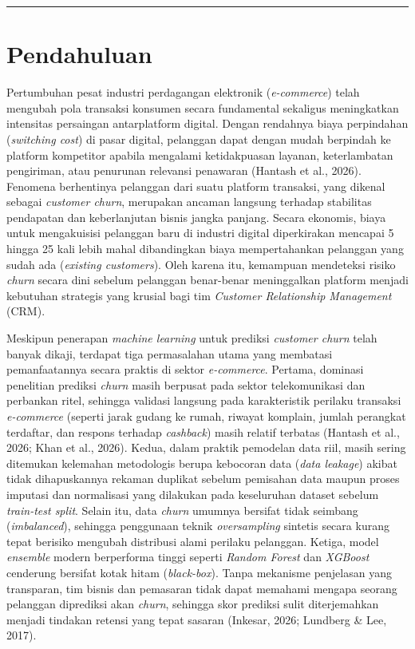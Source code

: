 \documentclass[11pt,a4paper]{article}
\begin{document}
\vspace{4pt}
\hrule
\vspace{8pt}

\section{Pendahuluan}

Pertumbuhan pesat industri perdagangan elektronik (\textit{e-commerce}) telah mengubah pola transaksi konsumen secara fundamental sekaligus meningkatkan intensitas persaingan antarplatform digital. Dengan rendahnya biaya perpindahan (\textit{switching cost}) di pasar digital, pelanggan dapat dengan mudah berpindah ke platform kompetitor apabila mengalami ketidakpuasan layanan, keterlambatan pengiriman, atau penurunan relevansi penawaran (Hantash et al., 2026). Fenomena berhentinya pelanggan dari suatu platform transaksi, yang dikenal sebagai \textit{customer churn}, merupakan ancaman langsung terhadap stabilitas pendapatan dan keberlanjutan bisnis jangka panjang. Secara ekonomis, biaya untuk mengakuisisi pelanggan baru di industri digital diperkirakan mencapai 5 hingga 25 kali lebih mahal dibandingkan biaya mempertahankan pelanggan yang sudah ada (\textit{existing customers}). Oleh karena itu, kemampuan mendeteksi risiko \textit{churn} secara dini sebelum pelanggan benar-benar meninggalkan platform menjadi kebutuhan strategis yang krusial bagi tim \textit{Customer Relationship Management} (CRM).

Meskipun penerapan \textit{machine learning} untuk prediksi \textit{customer churn} telah banyak dikaji, terdapat tiga permasalahan utama yang membatasi pemanfaatannya secara praktis di sektor \textit{e-commerce}. Pertama, dominasi penelitian prediksi \textit{churn} masih berpusat pada sektor telekomunikasi dan perbankan ritel, sehingga validasi langsung pada karakteristik perilaku transaksi \textit{e-commerce} (seperti jarak gudang ke rumah, riwayat komplain, jumlah perangkat terdaftar, dan respons terhadap \textit{cashback}) masih relatif terbatas (Hantash et al., 2026; Khan et al., 2026). Kedua, dalam praktik pemodelan data riil, masih sering ditemukan kelemahan metodologis berupa kebocoran data (\textit{data leakage}) akibat tidak dihapuskannya rekaman duplikat sebelum pemisahan data maupun proses imputasi dan normalisasi yang dilakukan pada keseluruhan dataset sebelum \textit{train-test split}. Selain itu, data \textit{churn} umumnya bersifat tidak seimbang (\textit{imbalanced}), sehingga penggunaan teknik \textit{oversampling} sintetis secara kurang tepat berisiko mengubah distribusi alami perilaku pelanggan. Ketiga, model \textit{ensemble} modern berperforma tinggi seperti \textit{Random Forest} dan \textit{XGBoost} cenderung bersifat kotak hitam (\textit{black-box}). Tanpa mekanisme penjelasan yang transparan, tim bisnis dan pemasaran tidak dapat memahami mengapa seorang pelanggan diprediksi akan \textit{churn}, sehingga skor prediksi sulit diterjemahkan menjadi tindakan retensi yang tepat sasaran (Inkesar, 2026; Lundberg \& Lee, 2017).
\end{document}
